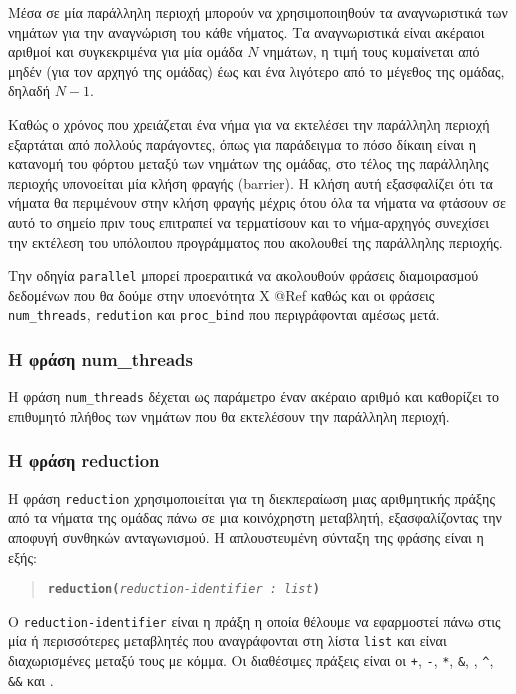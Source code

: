 Μέσα σε μία παράλληλη περιοχή μπορούν να χρησιμοποιηθούν τα αναγνωριστικά των νημάτων για την αναγνώριση του κάθε νήματος. Τα αναγνωριστικά είναι ακέραιοι αριθμοί και συγκεκριμένα για μία ομάδα $N$ νημάτων, η τιμή τους κυμαίνεται από μηδέν (για τον αρχηγό της ομάδας) έως και ένα λιγότερο από το μέγεθος της ομάδας, δηλαδή $N-1$.

Καθώς ο χρόνος που χρειάζεται ένα νήμα για να εκτελέσει την παράλληλη περιοχή εξαρτάται από πολλούς παράγοντες, όπως για παράδειγμα το πόσο δίκαιη είναι η κατανομή του φόρτου μεταξύ των νημάτων της ομάδας, στο τέλος της παράλληλης περιοχής υπονοείται μία κλήση φραγής (barrier). Η κλήση αυτή εξασφαλίζει ότι τα νήματα θα περιμένουν στην κλήση φραγής μέχρις ότου όλα τα νήματα να φτάσουν σε αυτό το σημείο πριν τους επιτραπεί να τερματίσουν και το νήμα-αρχηγός συνεχίσει την εκτέλεση του υπόλοιπου προγράμματος που ακολουθεί της παράλληλης περιοχής.

Την οδηγία \texttt{parallel} μπορεί προεραιτικά να ακολουθούν φράσεις διαμοιρασμού δεδομένων που θα δούμε στην υποενότητα Χ @Ref καθώς και οι φράσεις \texttt{num\_threads}, \texttt{redution} και \texttt{proc\_bind} που περιγράφονται αμέσως μετά.

\subsubsection{Η φράση num\_threads}
Η φράση \texttt{num\_threads} δέχεται ως παράμετρο έναν ακέραιο αριθμό και καθορίζει το επιθυμητό πλήθος των νημάτων που θα εκτελέσουν την παράλληλη περιοχή.

\subsubsection{Η φράση reduction}
Η φράση \texttt{reduction} χρησιμοποιείται για τη διεκπεραίωση μιας αριθμητικής πράξης από τα νήματα της ομάδας πάνω σε μια κοινόχρηστη μεταβλητή, εξασφαλίζοντας την αποφυγή συνθηκών ανταγωνισμού. Η απλουστευμένη σύνταξη της φράσης είναι η εξής:
\begin{quote}
	\texttt{\textbf{reduction(}\textit{reduction-identifier : list}\textbf{)}}
\end{quote}

Ο \texttt{reduction-identifier} είναι η πράξη η οποία θέλουμε να εφαρμοστεί πάνω στις μία ή περισσότερες μεταβλητές που αναγράφονται στη λίστα \texttt{list} και είναι διαχωρισμένες μεταξύ τους με κόμμα. Οι διαθέσιμες πράξεις είναι οι \texttt{+}, \texttt{-}, \texttt{*}, \texttt{\&}, \texttt{\textbar}, \texttt{\string^}, \texttt{\&\&} και \texttt{\textbar\textbar}.

